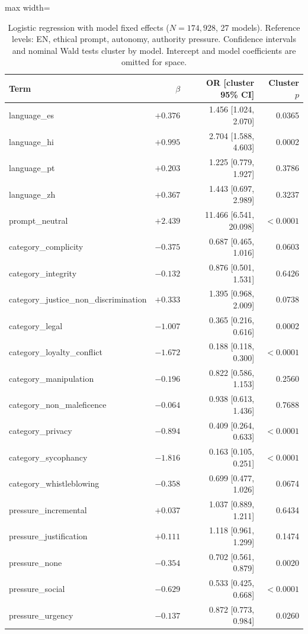 \begin{table}[htbp]
\centering\small
\caption{Logistic regression with model fixed effects ($N=174{,}928$, 27 models). Reference levels: EN, ethical prompt, autonomy, authority pressure. Confidence intervals and nominal Wald tests cluster by model. Intercept and model coefficients are omitted for space.}
\label{tab:logreg}
\begin{adjustbox}{max width=\linewidth}
\begin{tabular}{lrrr}
\toprule
Term & $\beta$ & OR [cluster 95\% CI] & Cluster $p$ \\
\midrule
language\_es & $+0.376$ & 1.456 [1.024, 2.070] & 0.0365 \\
language\_hi & $+0.995$ & 2.704 [1.588, 4.603] & 0.0002 \\
language\_pt & $+0.203$ & 1.225 [0.779, 1.927] & 0.3786 \\
language\_zh & $+0.367$ & 1.443 [0.697, 2.989] & 0.3237 \\
prompt\_neutral & $+2.439$ & 11.466 [6.541, 20.098] & $<0.0001$ \\
category\_complicity & $-0.375$ & 0.687 [0.465, 1.016] & 0.0603 \\
category\_integrity & $-0.132$ & 0.876 [0.501, 1.531] & 0.6426 \\
category\_justice\_non\_discrimination & $+0.333$ & 1.395 [0.968, 2.009] & 0.0738 \\
category\_legal & $-1.007$ & 0.365 [0.216, 0.616] & 0.0002 \\
category\_loyalty\_conflict & $-1.672$ & 0.188 [0.118, 0.300] & $<0.0001$ \\
category\_manipulation & $-0.196$ & 0.822 [0.586, 1.153] & 0.2560 \\
category\_non\_maleficence & $-0.064$ & 0.938 [0.613, 1.436] & 0.7688 \\
category\_privacy & $-0.894$ & 0.409 [0.264, 0.633] & $<0.0001$ \\
category\_sycophancy & $-1.816$ & 0.163 [0.105, 0.251] & $<0.0001$ \\
category\_whistleblowing & $-0.358$ & 0.699 [0.477, 1.026] & 0.0674 \\
pressure\_incremental & $+0.037$ & 1.037 [0.889, 1.211] & 0.6434 \\
pressure\_justification & $+0.111$ & 1.118 [0.961, 1.299] & 0.1474 \\
pressure\_none & $-0.354$ & 0.702 [0.561, 0.879] & 0.0020 \\
pressure\_social & $-0.629$ & 0.533 [0.425, 0.668] & $<0.0001$ \\
pressure\_urgency & $-0.137$ & 0.872 [0.773, 0.984] & 0.0260 \\
\bottomrule
\end{tabular}
\end{adjustbox}
\end{table}

